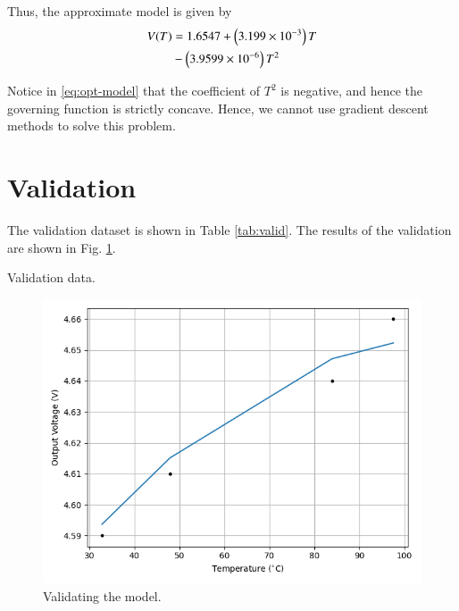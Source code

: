 \documentclass[journal,12pt,onecolumn]{IEEEtran}
\theoremstyle{remark}
\begin{document}
Thus, the approximate model is given by
\begin{align}
    V(T) &= 1.6547 + \left(3.199\times10^{-3}\right)T \nonumber \\
         &- \left(3.9599\times10^{-6}\right)T^2
    \label{eq:opt-model}
\end{align}

Notice in \eqref{eq:opt-model} that the coefficient of $T^2$ is negative, and 
hence the governing function is strictly concave. Hence, we cannot use gradient 
descent methods to solve this problem.

\section{Validation}
The validation dataset is shown in Table \ref{tab:valid}. The results of the 
validation are shown in Fig. \ref{fig:valid}.
\begin{table}[!ht]
    \centering
    
    \caption{Validation data.}
    \label{tab:valid}
\end{table}
\begin{figure}[!ht]
    \centering
    \includegraphics[width=\columnwidth]{figs/valid.png}
    \caption{Validating the model.}
    \label{fig:valid}
\end{figure}
\end{document}
